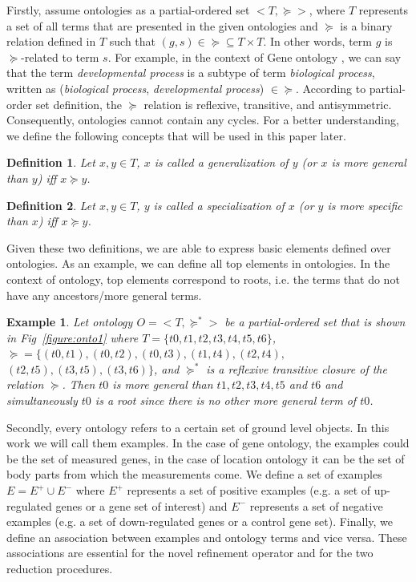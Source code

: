 \documentclass{bmcart}
\newtheorem{definition}{Definition}
\newtheorem{example}{Example}
\begin{document}
Firstly, assume ontologies as a partial-ordered set $<T,\succeq>$, where $T$ represents a set of all terms that are presented in the given ontologies and $\succeq$ is a binary relation defined in $T$ such that  $(g, s) \in \succeq \subseteq T \times T$. In other words, term $g$ is $\succeq$-related to term $s$. For example, in the context of Gene ontology \cite{ashburner2000gene,gene2016expansion}, we can say that the term \emph{developmental process} is a subtype of term \emph{biological process}, written as (\emph{biological process}, \emph{developmental process}) $\in \succeq$. According to partial-order set definition, the $\succeq$ relation is reflexive, transitive, and antisymmetric. Consequently, ontologies cannot contain any cycles. For a better understanding, we define the following concepts that will be used in this paper later. 

\begin{definition}
Let $x,y \in T$, $x$ is called a \emph{generalization} of $y$ (or $x$ is more general than $y$) iff $x \succeq y$.
\end{definition}

\begin{definition}
 Let $x,y \in T$, $y$ is called a \emph{specialization} of $x$ (or $y$ is more specific than $x$) iff $x \succeq y$.
\end{definition}

Given these two definitions, we are able to express basic elements defined over ontologies. As an example, we can define all top elements in ontologies. In the context of ontology, top elements correspond to roots, i.e. the terms that do not have any ancestors/more general terms.


\begin{example}\label{ex:onto}
    Let ontology $O = <T,\succeq^{*}>$ be a partial-ordered set that is shown in Fig~\ref{figure:onto1} where $T=\{t0,t1,t2,t3,t4,t5,t6\}$, $\succeq=\{(t0,t1), (t0,t2), (t0,t3), (t1,t4), (t2,t4),$ $(t2,t5), (t3,t5), (t3,t6)\}$, and $\succeq^{*}$ is a reflexive transitive closure of the relation $\succeq$. Then $t0$ is more general than $t1,t2,t3,t4,t5$ and $t6$ and simultaneously $t0$ is a root since there is no other more general term of $t0$.
\end{example}


Secondly, every ontology refers to a certain set of ground level objects. In this work we will call them examples. In the case of gene ontology, the examples could be the set of measured genes, in the case of location ontology it can be the set of body parts from which the measurements come. We define a set of examples $E = E^{+} \cup E^{-}$ where $E^{+}$ represents a set of positive examples (e.g. a set of up-regulated genes or a gene set of interest) and $E^{-}$ represents a set of negative examples (e.g. a set of down-regulated genes or a control gene set). 
Finally, we define an association between examples and ontology terms and vice versa. These associations are essential for the novel refinement operator and for the two reduction procedures. 
\end{document}
